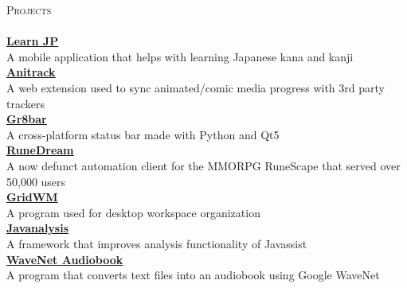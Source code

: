 \documentclass[a4paper]{article}
\newcommand{\lineunder} {
    \vspace*{-8pt} \\
    \hspace*{-18pt} \hrulefill \\
}
\newcommand{\header} [1] {
    {\hspace*{-18pt}\vspace*{6pt} \textsc{#1}}
    \vspace*{-6pt} \lineunder
}
\begin{document}
\header{Projects}
{\textbf{\href{https://itunes.apple.com/us/app/learn-jp/id1447060691}{\ul{Learn JP}}}}\\
\vspace*{1mm}
A mobile application that helps with learning Japanese kana and kanji\\
\vspace*{2mm}
{\textbf{\href{https://github.com/TSedlar/anitrack}{\ul{Anitrack}}}}\\
\vspace*{1mm}
A web extension used to sync animated/comic media progress with 3rd party trackers\\
\vspace*{2mm}
{\textbf{\href{https://github.com/TSedlar/gr8bar}{\ul{Gr8bar}}}}\\
\vspace*{1mm}
A cross-platform status bar made with Python and Qt5\\
\vspace*{2mm}
{\textbf{\href{https://github.com/FThompson/RuneDream-API}{\ul{RuneDream}}}}\\
\vspace*{1mm}
A now defunct automation client for the MMORPG RuneScape that served over 50,000 users\\
\vspace*{2mm}
{\textbf{\href{https://github.com/TSedlar/GridWM}{\ul{GridWM}}}}\\
\vspace*{1mm}
A program used for desktop workspace organization\\
\vspace*{2mm}
{\textbf{\href{https://github.com/disassemble-io/javanalysis}{\ul{Javanalysis}}}}\\
\vspace*{1mm}
A framework that improves analysis functionality of Javassist\\
\vspace*{2mm}
{\textbf{\href{https://github.com/TSedlar/wavenet-audiobook}{\ul{WaveNet Audiobook}}}}\\
\vspace*{1mm}
A program that converts text files into an audiobook using Google WaveNet\\
\vspace*{2mm}
\end{document}
